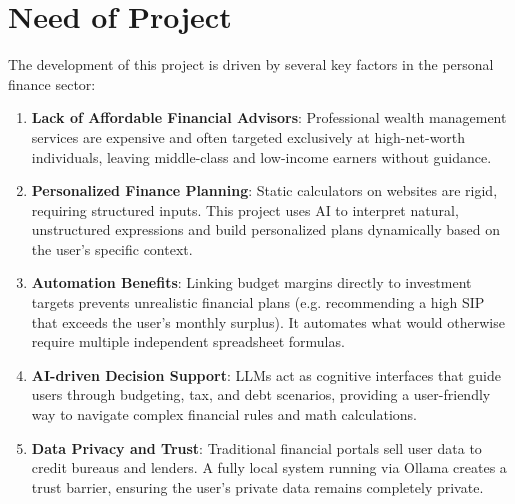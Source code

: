 \section{Need of Project}
The development of this project is driven by several key factors in the personal finance sector:
\begin{enumerate}
    \item \textbf{Lack of Affordable Financial Advisors}: Professional wealth management services are expensive and often targeted exclusively at high-net-worth individuals, leaving middle-class and low-income earners without guidance.
    \item \textbf{Personalized Finance Planning}: Static calculators on websites are rigid, requiring structured inputs. This project uses AI to interpret natural, unstructured expressions and build personalized plans dynamically based on the user's specific context.
    \item \textbf{Automation Benefits}: Linking budget margins directly to investment targets prevents unrealistic financial plans (e.g. recommending a high SIP that exceeds the user's monthly surplus). It automates what would otherwise require multiple independent spreadsheet formulas.
    \item \textbf{AI-driven Decision Support}: LLMs act as cognitive interfaces that guide users through budgeting, tax, and debt scenarios, providing a user-friendly way to navigate complex financial rules and math calculations.
    \item \textbf{Data Privacy and Trust}: Traditional financial portals sell user data to credit bureaus and lenders. A fully local system running via Ollama creates a trust barrier, ensuring the user's private data remains completely private.
\end{enumerate}
